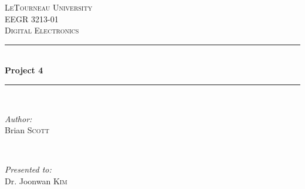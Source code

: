 \begin{titlepage}
\newcommand{\HRule}{\rule{\linewidth}{0.4mm}} %

\center %


\textsc{\LARGE LeTourneau University}\\[1.5cm] %
\textsc{\Large EEGR 3213-01}\\[0.5cm] %
\textsc{\large Digital Electronics}\\[0.5cm] %


\HRule \\[0.4cm]
{\huge \bfseries Project 4} %
\HRule \\[3cm]

\begin{minipage}{0.35\textwidth}
	\begin{flushleft} \Large
		\emph{Author:}\\
		Brian \textsc{Scott} %
	\end{flushleft}
\end{minipage}
~
\begin{minipage}{0.35\textwidth}
	\begin{flushright} \Large
		\emph{Presented to:} \\
		Dr. Joonwan \textsc{Kim} %
	\end{flushright}
\end{minipage}\\[4cm]



\end{titlepage}
